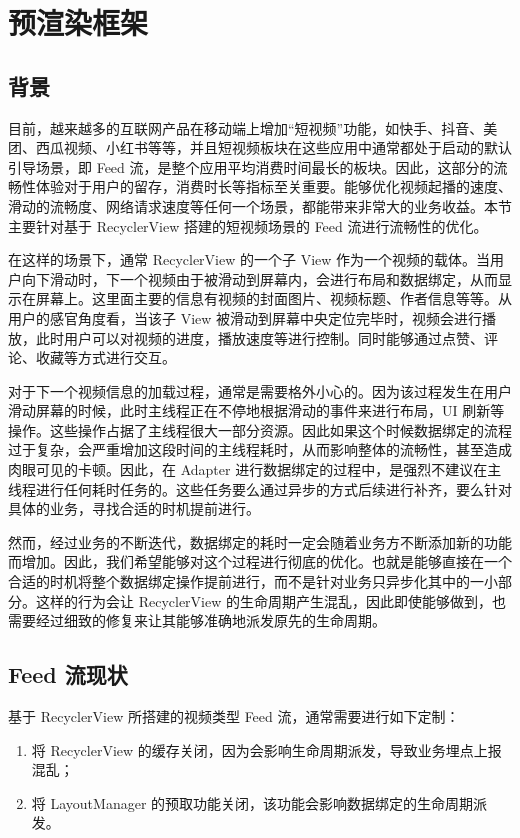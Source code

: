 \chapter{预渲染框架}

\section{背景}

目前，越来越多的互联网产品在移动端上增加“短视频”功能，如快手、抖音、美团、西瓜视频、小红书等等，并且短视频板块在这些应用中通常都处于启动的默认引导场景，即 Feed 流，是整个应用平均消费时间最长的板块。因此，这部分的流畅性体验对于用户的留存，消费时长等指标至关重要。能够优化视频起播的速度、滑动的流畅度、网络请求速度等任何一个场景，都能带来非常大的业务收益。本节主要针对基于 RecyclerView 搭建的短视频场景的 Feed 流进行流畅性的优化。

在这样的场景下，通常 RecyclerView 的一个子 View 作为一个视频的载体。当用户向下滑动时，下一个视频由于被滑动到屏幕内，会进行布局和数据绑定，从而显示在屏幕上。这里面主要的信息有视频的封面图片、视频标题、作者信息等等。从用户的感官角度看，当该子 View 被滑动到屏幕中央定位完毕时，视频会进行播放，此时用户可以对视频的进度，播放速度等进行控制。同时能够通过点赞、评论、收藏等方式进行交互。

对于下一个视频信息的加载过程，通常是需要格外小心的。因为该过程发生在用户滑动屏幕的时候，此时主线程正在不停地根据滑动的事件来进行布局，UI 刷新等操作。这些操作占据了主线程很大一部分资源。因此如果这个时候数据绑定的流程过于复杂，会严重增加这段时间的主线程耗时，从而影响整体的流畅性，甚至造成肉眼可见的卡顿。因此，在 Adapter 进行数据绑定的过程中，是强烈不建议在主线程进行任何耗时任务的。这些任务要么通过异步的方式后续进行补齐，要么针对具体的业务，寻找合适的时机提前进行。

然而，经过业务的不断迭代，数据绑定的耗时一定会随着业务方不断添加新的功能而增加。因此，我们希望能够对这个过程进行彻底的优化。也就是能够直接在一个合适的时机将整个数据绑定操作提前进行，而不是针对业务只异步化其中的一小部分。这样的行为会让 RecyclerView 的生命周期产生混乱，因此即使能够做到，也需要经过细致的修复来让其能够准确地派发原先的生命周期。

\section{Feed 流现状}

基于 RecyclerView 所搭建的视频类型 Feed 流，通常需要进行如下定制：

\begin{enumerate}
    \item 将 RecyclerView 的缓存关闭，因为会影响生命周期派发，导致业务埋点上报混乱；
    \item 将 LayoutManager 的预取功能关闭，该功能会影响数据绑定的生命周期派发。
\end{enumerate}

